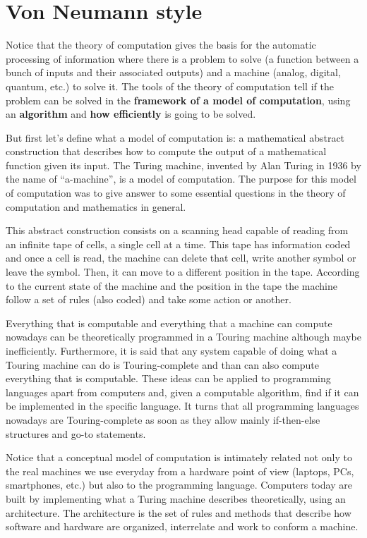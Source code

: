  


    \newpage   
    \section{Von Neumann style}  \label{sec:vonNeu}
Notice that the theory of computation gives the basis for the automatic processing of information where there is a 
problem to solve (a function between a bunch of inputs and their associated outputs) 
and a machine (analog, digital, quantum, etc.) to solve it. 
The tools of the theory of computation tell 
if the problem can be solved in the \textbf{framework of a model of computation}, 
using an \textbf{algorithm} and 
\textbf{how efficiently} is going to be solved.

But first let's define what a model of computation is: a mathematical abstract construction 
that describes how to compute the output of a mathematical function given its input.
The Turing machine, invented by Alan Turing in 1936 by the name of ``a-machine'', is a model of computation. 
The purpose for this model of computation was to give answer to some essential questions 
in the theory of computation and mathematics in general. 

This abstract construction consists on a scanning head capable of reading from an 
infinite tape of cells, a single cell at a time. 
This tape has information coded and once a cell is read, the machine can delete that cell, 
write another symbol or leave the symbol. 
Then, it can move to a different position in the tape. 
According to the current state of the 
machine and the position in the tape the machine follow a set of rules (also coded) and take some action or another. 

Everything that is computable and everything that a machine can compute nowadays can be theoretically programmed in a Touring machine 
although maybe inefficiently. 
Furthermore, it is said that any system capable of doing what a Touring machine can do is Touring-complete and 
than can also compute everything that is computable. 
These ideas can be applied to programming languages apart from computers and,
given a computable algorithm, find if it can be implemented in the specific language.
It turns that all programming languages nowadays are Touring-complete as soon as they allow 
mainly if-then-else structures and go-to statements. 

Notice that a conceptual model of computation is intimately related not only to the 
real machines we use everyday from a hardware point of view (laptops, PCs, smartphones, etc.) 
but also to the programming language. 
Computers today are built by implementing what 
a Turing machine describes theoretically, using an architecture. 
The architecture is the set of rules and methods that describe how software 
and hardware are organized, interrelate and work to conform a machine.

